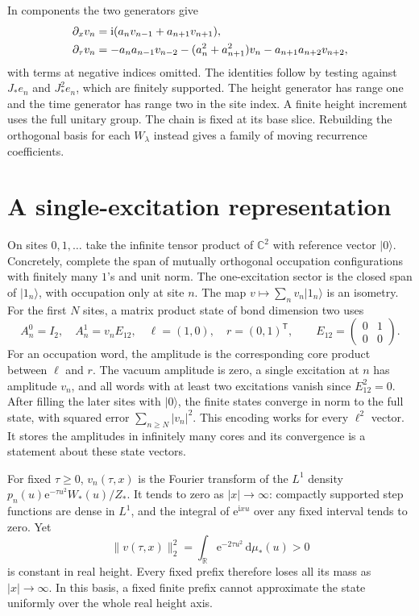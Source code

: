 \documentclass[11pt]{article}
\numberwithin{equation}{section}
\newcommand{\R}{\mathbb R}
\newcommand{\C}{\mathbb C}
\newcommand{\ee}{\mathrm e}
\newcommand{\ii}{\mathrm i}
\newcommand{\dd}{\,\mathrm d}
\begin{document}
In components the two generators give
\begin{align}
 \partial_x v_n
    &=\ii(a_nv_{n-1}+a_{n+1}v_{n+1}),\notag\\
 \partial_\tau v_n
    &=-a_na_{n-1}v_{n-2}-(a_n^2+a_{n+1}^2)v_n
       -a_{n+1}a_{n+2}v_{n+2},                       \label{eq:lattice}
\end{align}
with terms at negative indices omitted. The identities follow
by testing against \(J_*e_n\) and \(J_*^2e_n\), which are finitely
supported. The height generator has range one and the time
generator has range two in the site index. A finite height
increment uses the full unitary group. The chain is fixed at its
base slice. Rebuilding the orthogonal basis for each \(W_\lambda\)
instead gives a family of moving recurrence coefficients.

\section{A single-excitation representation}\label{sec:mps}

On sites \(0,1,\ldots\) take the infinite tensor product of
\(\C^2\) with reference vector \(|0\rangle\). Concretely, complete the
span of mutually orthogonal occupation configurations with
finitely many \(1\)'s and unit norm. The one-excitation sector is
the closed span of \(|1_n\rangle\), with occupation only at site
\(n\). The map \(v\mapsto\sum_n v_n|1_n\rangle\) is an isometry.
For the first \(N\) sites, a matrix product state of bond dimension
two uses
\[
 A_n^0=I_2,\quad A_n^1=v_nE_{12},\quad
 \ell=(1,0),\quad r=(0,1)^{\mathsf T},
 \qquad E_{12}=\begin{pmatrix}0&1\\0&0\end{pmatrix}.
\]
For an occupation word, the amplitude is the corresponding core
product between \(\ell\) and \(r\). The vacuum amplitude is zero,
a single excitation at \(n\) has amplitude \(v_n\), and all words
with at least two excitations vanish since \(E_{12}^2=0\).
After filling the later sites with \(|0\rangle\), the finite
states converge in norm to the full state, with squared error
\(\sum_{n\ge N}|v_n|^2\). This encoding works for every
\(\ell^2\) vector. It stores the amplitudes in infinitely many cores
and its convergence is a statement about these state vectors.

For fixed \(\tau\ge0\), \(v_n(\tau,x)\) is the Fourier transform of
the \(L^1\) density \(p_n(u)\ee^{-\tau u^2}W_*(u)/Z_*\). It tends
to zero as \(|x|\to\infty\): compactly supported step functions
are dense in \(L^1\), and the integral of \(\ee^{\ii xu}\) over
any fixed interval tends to zero. Yet
\[
 \|v(\tau,x)\|_2^2=\int_\R\ee^{-2\tau u^2}\dd\mu_*(u)>0
\]
is constant in real height. Every fixed prefix therefore loses
all its mass as \(|x|\to\infty\). In this basis, a fixed finite
prefix cannot approximate the state uniformly over the whole
real height axis.
\end{document}
